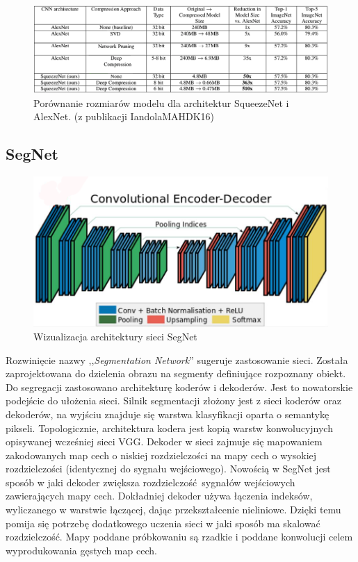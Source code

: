 \documentclass[12pt,a4paper,twoside,titlepage,openright]{book}
\begin{document}
\begin{itemize}
\begin{figure}[ht]
	\centering
			\includegraphics[resolution=100, scale=0.55]{squeezeNetCompression.png}
		\caption{Porównanie rozmiarów modelu dla architektur SqueezeNet i AlexNet. (z publikacji IandolaMAHDK16)}
\end{figure}

\subsection{SegNet}
\begin{figure}[ht]
	\centering
			\includegraphics[resolution=100, scale=0.4]{SegNet.png}
		\caption{Wizualizacja architektury sieci SegNet}
\end{figure}
Rozwinięcie nazwy ,,\textit{Segmentation Network}'' sugeruje zastosowanie sieci. Została zaprojektowana do dzielenia obrazu na segmenty definiujące rozpoznany obiekt. Do segregacji zastosowano architekturę koderów i dekoderów. Jest to nowatorskie podejście do ułożenia sieci. Silnik segmentacji złożony jest z sieci koderów oraz dekoderów, na wyjściu znajduje się warstwa klasyfikacji oparta o semantykę pikseli. Topologicznie, architektura kodera jest kopią warstw konwolucyjnych opisywanej wcześniej sieci VGG. Dekoder w sieci zajmuje się mapowaniem zakodowanych map cech o niskiej rozdzielczości na mapy cech o wysokiej rozdzielczości (identycznej do sygnału wejściowego). Nowością w SegNet jest sposób w jaki dekoder zwiększa rozdzielczość sygnałów wejściowych zawierających mapy cech. Dokładniej dekoder używa łączenia indeksów, wyliczanego w warstwie łączącej, dając przekształcenie nieliniowe. Dzięki temu pomija się potrzebę dodatkowego uczenia sieci w jaki sposób ma skalować rozdzielczość. Mapy poddane próbkowaniu są rzadkie i poddane konwolucji celem wyprodukowania gęstych map cech.


\end{itemize}
\end{document}
